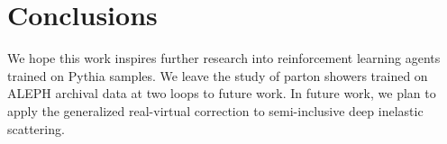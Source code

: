 \section{Conclusions}\label{sec:conclusions}

We hope this work inspires further research into reinforcement learning
agents trained on Pythia samples. We leave the study of parton showers
trained on ALEPH archival data at two loops to future work. In future
work, we plan to apply the generalized real-virtual correction to
semi-inclusive deep inelastic scattering.

